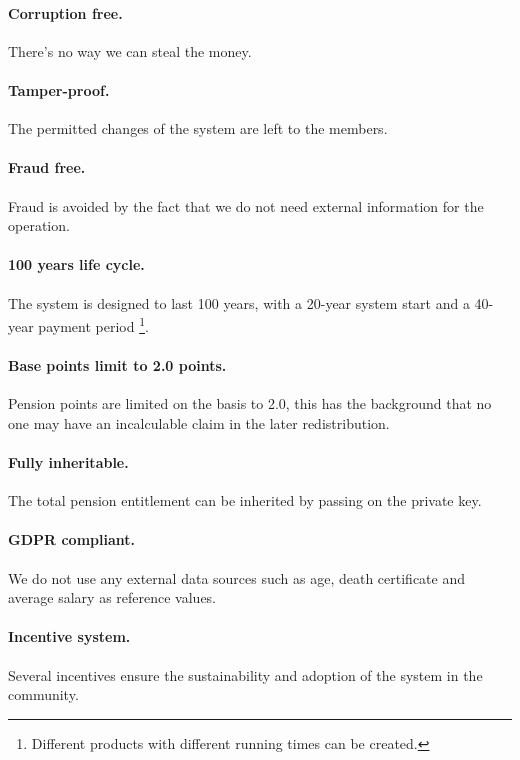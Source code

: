 \paragraph{Corruption free.} There's no way we can steal the money.

\paragraph{Tamper-proof.} The permitted changes of the system are left to the members.

\paragraph{Fraud free.}
Fraud is avoided by the fact that we do not need external information for the operation. 

\paragraph{100 years life cycle.} 
The system is designed to last 100 years, with a 20-year system start and a 40-year payment period \footnote{ Different products with different running times can be created.}.  

\paragraph{Base points limit to 2.0 points.} 
Pension points are limited on the basis to 2.0, this has the background that no one may have an incalculable claim in the later redistribution.

\paragraph{Fully inheritable.}
The total pension entitlement can be inherited by passing on the private key.

\paragraph{GDPR compliant\cite{gdpr}.} 
We do not use any external data sources such as age, death certificate and average salary as reference values.

\paragraph{Incentive system.} 
Several incentives ensure the sustainability and adoption of the system in the community.


